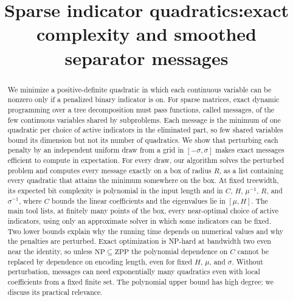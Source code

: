 \documentclass[11pt]{article}
\title{Sparse indicator quadratics:\newline exact complexity and smoothed separator messages}
\author{}
\date{}
\theoremstyle{definition}
\theoremstyle{remark}
\begin{document}
\maketitle
\begin{abstract}
We minimize a positive-definite quadratic in which each continuous
variable can be nonzero only if a penalized binary indicator is on. For
sparse matrices, exact dynamic programming over a tree decomposition
must pass functions, called messages, of the few continuous variables
shared by subproblems. Each message is the minimum of one quadratic per
choice of active indicators in the eliminated part, so few shared
variables bound its dimension but not its number of quadratics. We show
that perturbing each penalty by an independent uniform draw from a grid
in $[-\sigma,\sigma]$ makes exact messages efficient to compute in
expectation. For every draw, our algorithm solves the perturbed problem
and computes every message exactly on a box of radius $R$, as a list
containing every quadratic that attains the minimum somewhere on the
box. At fixed treewidth, its expected bit complexity is polynomial in
the input length and in $C$, $H$, $\mu^{-1}$, $R$, and $\sigma^{-1}$,
where $C$ bounds the linear coefficients and the eigenvalues lie in
$[\mu,H]$. The main tool lists, at finitely many points of the box,
every near-optimal choice of active indicators, using only an
approximate solver in which some indicators can be fixed. Two lower
bounds explain why the running time depends on numerical values and why
the penalties are perturbed. Exact optimization is NP-hard at
bandwidth two even near the identity, so unless
$\mathrm{NP}\subseteq\mathrm{ZPP}$ the polynomial dependence on $C$
cannot be replaced by dependence on encoding length, even for fixed
$H$, $\mu$, and $\sigma$. Without perturbation, messages can need
exponentially many quadratics even with local coefficients from a fixed
finite set. The polynomial upper bound has high degree; we discuss its
practical relevance.
\end{abstract}








\appendix



\end{document}
